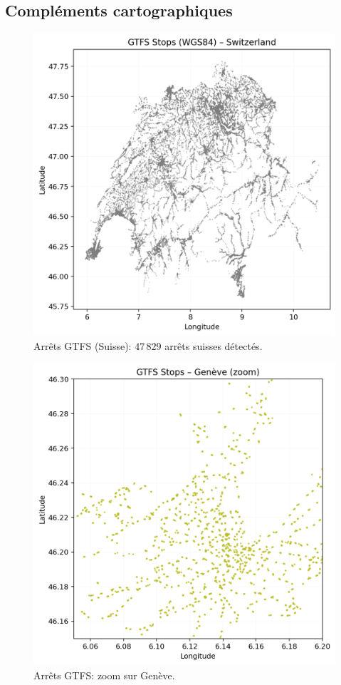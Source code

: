 \subsection{Compléments cartographiques}
\begin{figure}[h]
  \centering
  \includegraphics[width=.76\linewidth]{figures/plots/gtfs_points_switzerland.png}
  \caption[Arrêts GTFS (Suisse)]{Arrêts GTFS (Suisse): \(47\,829\) arrêts suisses détectés.}
  \label{fig:gtfs_ch_points}
\end{figure}

\begin{figure}[h]
  \centering
  \includegraphics[width=.6\linewidth]{figures/plots/gtfs_points_geneva.png}
  \caption[Arrêts GTFS (Genève)]{Arrêts GTFS: zoom sur Genève.}
  \label{fig:gtfs_geneva}
\end{figure}

